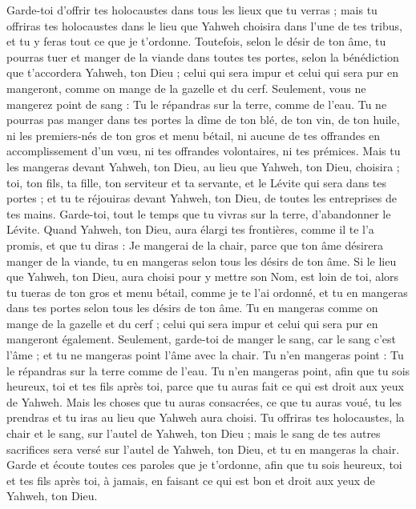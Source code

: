 \begin{multicols}{2}
Garde-toi d’offrir tes holocaustes dans tous les lieux que tu verras ;
mais tu offriras tes holocaustes dans le lieu que Yahweh choisira dans l'une de tes tribus, et tu y feras tout ce que je t’ordonne.
Toutefois, selon le désir de ton âme, tu pourras tuer et manger de la viande dans toutes tes portes, selon la bénédiction que t’accordera Yahweh, ton Dieu ; celui qui sera impur et celui qui sera pur en mangeront, comme on mange de la gazelle et du cerf.
Seulement, vous ne mangerez point de sang : Tu le répandras sur la terre, comme de l'eau.
Tu ne pourras pas manger dans tes portes la dîme de ton blé, de ton vin, de ton huile, ni les premiers-nés de ton gros et menu bétail, ni aucune de tes offrandes en accomplissement d’un vœu, ni tes offrandes volontaires, ni tes prémices.
Mais tu les mangeras devant Yahweh, ton Dieu, au lieu que Yahweh, ton Dieu, choisira ; toi, ton fils, ta fille, ton serviteur et ta servante, et le Lévite qui sera dans tes portes ; et tu te réjouiras devant Yahweh, ton Dieu, de toutes les entreprises de tes mains.
Garde-toi, tout le temps que tu vivras sur la terre, d'abandonner le Lévite.
Quand Yahweh, ton Dieu, aura élargi tes frontières, comme il te l’a promis, et que tu diras : Je mangerai de la chair, parce que ton âme désirera manger de la viande, tu en mangeras selon tous les désirs de ton âme.
Si le lieu que Yahweh, ton Dieu, aura choisi pour y mettre son Nom, est loin de toi, alors tu tueras de ton gros et menu bétail, comme je te l'ai ordonné, et tu en mangeras dans tes portes selon tous les désirs de ton âme.
Tu en mangeras comme on mange de la gazelle et du cerf ; celui qui sera impur et celui qui sera pur en mangeront également.
Seulement, garde-toi de manger le sang, car le sang c’est l'âme ; et tu ne mangeras point l'âme avec la chair.
Tu n'en mangeras point : Tu le répandras sur la terre comme de l'eau.
Tu n'en mangeras point, afin que tu sois heureux, toi et tes fils après toi, parce que tu auras fait ce qui est droit aux yeux de Yahweh.
Mais les choses que tu auras consacrées, ce que tu auras voué, tu les prendras et tu iras au lieu que Yahweh aura choisi.
Tu offriras tes holocaustes, la chair et le sang, sur l'autel de Yahweh, ton Dieu ; mais le sang de tes autres sacrifices sera versé sur l'autel de Yahweh, ton Dieu, et tu en mangeras la chair.
Garde et écoute toutes ces paroles que je t’ordonne, afin que tu sois heureux, toi et tes fils après toi, à jamais, en faisant ce qui est bon et droit aux yeux de Yahweh, ton Dieu.

\end{multicols}

